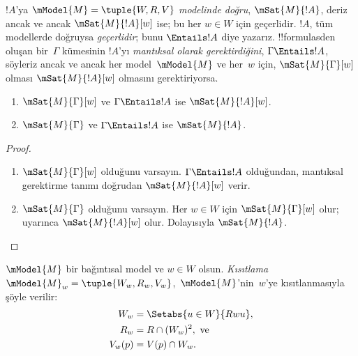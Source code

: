 



\begin{defn}
  $!A$'ya \emph{$\mModel{M} = \tuple{W,R,V}$ modelinde doğru}, $
  \mSat{M}{!A}$, deriz ancak ve ancak $\mSat{M}{!A}[w]$ ise; bu her $w \in W$
  için geçerlidir. $!A$, tüm modellerde doğruysa \emph{geçerlidir}; bunu
  $\Entails !A$ diye yazarız. !!{formula}s{}den oluşan bir~$\Gamma$ kümesinin
  $!A$'yı \emph{mantıksal olarak gerektirdiğini}, $\Gamma \Entails !A$,
  söyleriz ancak ve ancak her model~$\mModel{M}$ ve her~$w$ için,
  $\mSat{M}{\Gamma}[w]$ olması $\mSat{M}{!A}[w]$ olmasını gerektiriyorsa.
\end{defn}

\begin{prop}
  \begin{enumerate}
  \item{} $\mSat{M}{\Gamma}[w]$ ve
    $\Gamma \Entails !A$ ise $\mSat{M}{!A}[w]$.
  \item{} $\mSat{M}{\Gamma}$ ve $\Gamma
    \Entails !A$ ise $\mSat{M}{!A}$.
  \end{enumerate}
\end{prop}

\begin{proof}
  \begin{enumerate}
  \item $\mSat{M}{\Gamma}[w]$ olduğunu varsayın. $\Gamma \Entails !A$
    olduğundan, mantıksal gerektirme tanımı doğrudan $\mSat{M}{!A}[w]$ verir.
  \item $\mSat{M}{\Gamma}$ olduğunu varsayın. Her $w \in W$ için
    $\mSat{M}{\Gamma}[w]$ olur;  uyarınca
    $\mSat{M}{!A}[w]$ olur. Dolayısıyla $\mSat{M}{!A}$.
  \end{enumerate}
\end{proof}


\begin{defn}
  $\mModel{M}$ bir bağıntısal model ve $w \in W$ olsun. \emph{Kısıtlama}
  $\mModel{M}_w=\tuple{W_w, R_w, V_w}$,~$\mModel{M}$'nin~$w$'ye kısıtlanmasıyla
  şöyle verilir:
  \begin{align*}
    W_w & = \Setabs{u \in W}{Rwu},\\
    R_w  & = R \cap (W_w)^2, \text{ ve}\\
    V_w(p) & = V(p) \cap W_w.
  \end{align*}
\end{defn}

